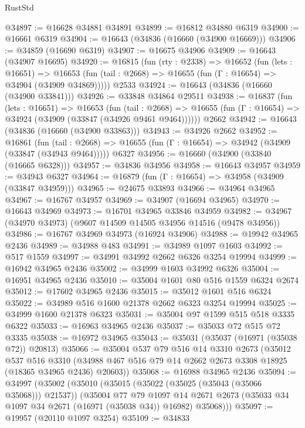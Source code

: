 \begin{lexlean}{RustStd}
\begin{coremodule}
@34897 := @16628 @34881 @34891
@34899 := @16812 @34880 @6319
@34900 := @16661 @6319
@34904 := @16643 (@34836 (@16660 (@34900 @16669)))
@34906 := @34859 (@16690 @6319)
@34907 := @16675 @34906
@34909 := @16643 (@34907 @16695)
@34920 := @16815
    (fun (rty : @2338) =>
    @16652
      (fun (lets : @16651) =>
      @16653 (fun (tail : @2668) => @16655 (fun (Γ : @16654) => @34904 (@34909 @34869)))))
    @2533
@34924 := @16643 (@34836 (@16660 (@34900 @33841)))
@34926 := @33848 @34864 @29511
@34938 := @16837
    (fun (lets : @16651) =>
    @16653
      (fun (tail : @2668) =>
      @16655 (fun (Γ : @16654) => @34924 (@34909 (@33847 (@34926 @9461 @9464))))))
    @2662
@34942 := @16643 (@34836 (@16660 (@34900 @33863)))
@34943 := @34926 @2662
@34952 := @16861
    (fun (tail : @2668) => @16655 (fun (Γ : @16654) => @34942 (@34909 (@33847 (@34943 @9464)))))
    @6327
@34956 := @16660 (@34900 (@33840 (@16665 @6328)))
@34957 := @34836 @34956
@34958 := @16643 @34957
@34959 := @34943 @6327
@34964 := @16879 (fun (Γ : @16654) => @34958 (@34909 (@33847 @34959)))
@34965 := @24675 @33893
@34966 := @34964 @34965
@34967 := @16767 @34957
@34969 := @34907 (@16694 @34965)
@34970 := @16643 @34969
@34973 := @16701 @34965 @33846 @34959
@34982 := @34967 (@34970 @34973) (@9607 @14509 @14505 @34956 @14516 (@9478 @34956))
@34986 := @16767 @34969 @34973 (@16924 @34906)
@34988 := @19942 @34965 @2436
@34989 := @34988 @483
@34991 := @34989 @1097 @1603
@34992 := @517 @1559
@34997 := @34991 @34992 @2662 @6326 @3254 @19994
@34999 := @16942 @34965 @2436
@35002 := @34999 @1603 @34992 @6326
@35004 := @16951 @34965 @2436
@35010 := @35004 @1601 @80 @516 @1559 @6324 @2674
@35012 := @17602 @34965 @2436
@35015 := @35012 @1601 @516 @6324
@35022 := @34989 @516 @1600 @21378 @2662 @6323 @3254 @19994
@35025 := @34999 @1600 @21378 @6323
@35031 := @35004 @97 @1599 @515 @518 @3335 @6322
@35033 := @16963 @34965 @2436
@35037 := @35033 @72 @515 @72 @3335
@35038 := @16972 @34965
@35043 := @35031 (@35037 (@16971 (@35038 @72)) @20813)
@35066 := @35004
    @537
    @79
    @516
    @14
    @3310
    @2673
    (@35012
      @537
      @516
      @3310
      (@34988 @467 @516 @79 @14 @2662 @2673 @3308 @18925 (@18365 @34965 @2436) @20603))
@35068 := @16988 @34965 @2436
@35094 := @34997
    (@35002
      (@35010
        (@35015 (@35022 (@35025 (@35043 (@35066 @35068))) @21537))
        (@35004
          @77
          @79
          @1097
          @14
          @2671
          @2673
          (@35033 @34 @1097 @34 @2671 (@16971 (@35038 @34)) @16982)
          @35068)))
@35097 := @19957 (@20110 @1097 @3254)
@35109 := @34833

\end{coremodule}
\end{lexlean}
